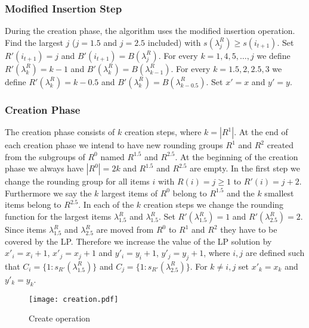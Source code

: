 \documentclass[a4paper,11pt]{article}
\begin{document}
\subsubsection*{Modified Insertion Step}
During the creation phase, the algorithm uses the modified insertion operation.
Find the largest $j$ ($j=1.5$ and $j= 2.5$ included) with $s(\lambda_{j}^R) \geq s(i_{t+1})$. 
Set $R'(i_{t+1})=j$ and $B'(i_{t+1})= B(\lambda_{j}^R)$.
For every $k= 1,4,5, \ldots, j$ we define $R'(\lambda_{k}^R) = k-1$ and $B'(\lambda_{k}^R) = B(\lambda_{k-1}^R)$.
For every $k = 1.5,2,2.5,3$ we define $R'(\lambda_{k}^R) = k-0.5$ and $B'(\lambda_{k}^R) = B(\lambda_{k-0.5}^R)$.
Set $x'=x$ and $y'=y$.

\subsubsection*{Creation Phase}
The creation phase consists of $k$ creation steps, where $k= |R^1|$. At the end of each creation phase we intend
to have new rounding groups $R^1$ and $R^2$ created from the subgroups of $R^0$ named $R^{1.5}$ and $R^{2.5}$.
At the beginning of the creation phase we always have $|R^0|= 2k$ and $R^{1.5}$ and $R^{2.5}$ are empty.
In the first step we change the rounding group
for all items $i$ with $R(i)=j \geq 1$ to $R'(i)=j+2$. 
Furthermore we say the $k$ largest items of $R^0$ belong to $R^{1.5}$ and the $k$ smallest items belong to $R^{2.5}$.
In each of the $k$ creation steps we change the rounding function for the largest items $\lambda_{1.5}^R$ 
and $\lambda_{1.5}^R$. Set $R'(\lambda_{1.5}^R) = 1$
and $R'(\lambda_{2.5}^R) = 2$. Since items $\lambda_{1.5}^R$ and $\lambda_{2.5}^R$ are moved from $R^0$ to $R^1$ 
and $R^2$ they have to be covered by
the LP. Therefore we increase the value of the LP solution by $x'_i = x_i + 1$, $x'_j = x_j+1$ and 
$y'_i = y_i + 1$, $y'_j = y_j+1$, where $i,j$ are defined such that 
$C_i = \{1:s_{R'}(\lambda_{1.5}^R) \}$ and $C_j = \{1:s_{R'}(\lambda_{2.5}^R) \}$. For $k \neq i,j$ set $x'_k = x_k$
and $y'_k = y_k$.
\begin{figure}
\texttt{[image: creation.pdf]}
\caption{Create operation}
\end{figure}
\end{document}
